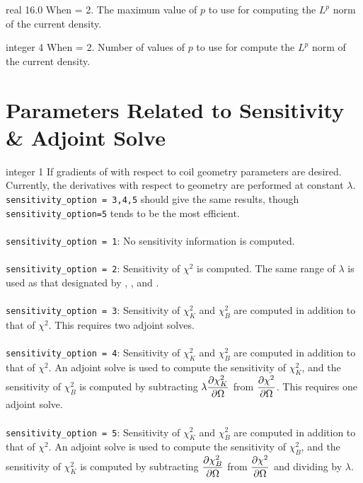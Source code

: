 \myhrule

{real}
{16.0}
{When  = 2.}
{
The maximum value of $p$ to use for computing the $L^p$ norm of the current density.
}

\myhrule

{integer}
{4}
{When  = 2.}
{
Number of values of $p$ to use for compute the $L^p$ norm of the current density. 
}

\myhrule

\section{Parameters Related to Sensitivity \& Adjoint Solve}

\myhrule

{integer}
{1}
{If gradients of with respect to coil geometry parameters are desired.}
{\\ Currently, the derivatives with respect to geometry are performed at constant $\lambda$. \texttt{sensitivity\_option = 3,4,5} should give the same results, though \texttt{sensitivity\_option=5} tends to be the most efficient. \\ \\
\texttt{sensitivity\_option = 1}: No sensitivity information is computed. \\ \\
\texttt{sensitivity\_option = 2}: Sensitivity of $\chi^2$ is computed. The same range of $\lambda$ is used as that designated by , , and . \\ \\
\texttt{sensitivity\_option = 3}: Sensitivity of $\chi^2_K$ and $\chi^2_B$ are computed in addition to that of $\chi^2$. This requires two adjoint solves. \\ \\
\texttt{sensitivity\_option = 4}: Sensitivity of $\chi^2_K$ and $\chi^2_B$ are computed in addition to that of $\chi^2$. An adjoint solve is used to compute the sensitivity of $\chi^2_K$, and the sensitivity of $\chi^2_B$ is computed by subtracting $\lambda \dfrac{\partial \chi^2_K}{\partial \Omega}$ from $\dfrac{\partial \chi^2}{\partial \Omega}$. This requires one adjoint solve. \\ \\
\texttt{sensitivity\_option = 5}: Sensitivity of $\chi^2_K$ and $\chi^2_B$ are computed in addition to that of $\chi^2$. An adjoint solve is used to compute the sensitivity of $\chi^2_B$, and the sensitivity of $\chi^2_K$ is computed by subtracting $\dfrac{\partial \chi^2_B}{\partial \Omega}$ from $\dfrac{\partial \chi^2}{\partial \Omega}$ and dividing by $\lambda$. 
}

